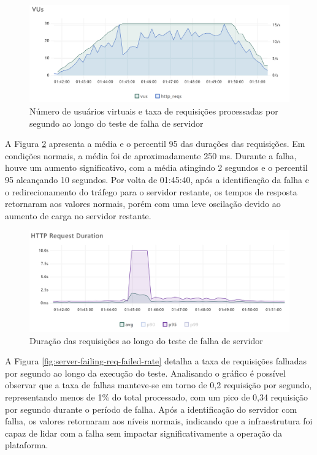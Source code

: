 \begin{figure}[H]
    \centering
    \includegraphics[width=1\textwidth]{assets/server-failing-test/vus-and-reqs.png}
    \caption{Número de usuários virtuais e taxa de requisições processadas por segundo ao longo do teste de falha de servidor}
    \label{fig:server-failing-vus-and-reqs}
\end{figure}

A Figura \ref{fig:server-failing-req-duration} apresenta a média e o percentil 95 das durações das requisições. Em condições normais, a média foi de aproximadamente 250 ms. Durante a falha, houve um aumento significativo, com a média atingindo 2 segundos e o percentil 95 alcançando 10 segundos. Por volta de 01:45:40, após a identificação da falha e o redirecionamento do tráfego para o servidor restante, os tempos de resposta retornaram aos valores normais, porém com uma leve oscilação devido ao aumento de carga no servidor restante.

\begin{figure}[H]
    \centering
    \includegraphics[width=1\textwidth]{assets/server-failing-test/req-duration.png}
    \caption{Duração das requisições ao longo do teste de falha de servidor}
    \label{fig:server-failing-req-duration}
\end{figure}

A Figura \ref{fig:server-failing-req-failed-rate} detalha a taxa de requisições falhadas por segundo ao longo da execução do teste. Analisando o gráfico é possível observar que a taxa de falhas manteve-se em torno de 0,2 requisição por segundo, representando menos de 1\% do total processado, com um pico de 0,34 requisição por segundo durante o período de falha. Após a identificação do servidor com falha, os valores retornaram aos níveis normais, indicando que a infraestrutura foi capaz de lidar com a falha sem impactar significativamente a operação da plataforma.


